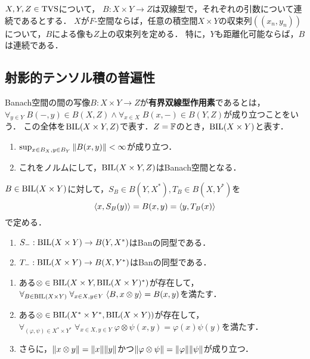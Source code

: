 \documentclass[uplatex,dvipdfmx]{jsreport}
\begin{document}
\begin{theorem}
    $X,Y,Z\in\mathrm{TVS}$について，
    $B:X\times Y\to Z$は双線型で，それぞれの引数について連続であるとする．
    $X$が$F$-空間ならば，任意の積空間$X\times Y$の収束列$((x_n,y_n))$について，$B$による像も$Z$上の収束列を定める．
    特に，$Y$も距離化可能ならば，$B$は連続である．
\end{theorem}

\subsection{射影的テンソル積の普遍性}

\begin{definition}
    Banach空間の間の写像$B:X\times Y\to Z$が\textbf{有界双線型作用素}であるとは，$\forall_{y\in Y}\;B(-,y)\in B(X,Z)\land\forall_{x\in X}\;B(x,-)\in B(Y,Z)$が成り立つことをいう．
    この全体を$\mathrm{BIL}(X\times Y,Z)$で表す．$Z=\mathbb{F}$のとき，$\mathrm{BIL}(X\times Y)$と表す．
\end{definition}

\begin{proposition}[有界双線型作用素の空間]\mbox{}
    \begin{enumerate}
        \item $\sup_{x\in B_X,y\in B_Y}\|B(x,y)\|<\infty$が成り立つ．
        \item これをノルムにして，$\mathrm{BIL}(X\times Y,Z)$はBanach空間となる．
    \end{enumerate}
\end{proposition}

\begin{proposition}
    $B\in\mathrm{BIL}(X\times Y)$に対して，$S_B\in B(Y,X^*),T_B\in B(X,Y^*)$を
    \[\langle x,S_B(y)\rangle=B(x,y)=\langle y,T_B(x)\rangle\]
    で定める．
    \begin{enumerate}
        \item $S_-:\mathrm{BIL}(X\times Y)\to B(Y,X^*)$はBanの同型である．
        \item $T_-:\mathrm{BIL}(X\times Y)\to B(X,Y^*)$はBanの同型である．
    \end{enumerate}
\end{proposition}

\begin{proposition}\mbox{}
    \begin{enumerate}
        \item ある$\otimes\in\mathrm{BIL}(X\times Y,\mathrm{BIL}(X\times Y)^*)$が存在して，$\forall_{B\in\mathrm{BIL}(X\times Y)}\;\forall_{x\in X,y\in Y}\;\langle B,x\otimes y\rangle=B(x,y)$を満たす．
        \item ある$\otimes\in\mathrm{BIL}(X^*\times Y^*,\mathrm{BIL}(X\times Y))$が存在して，$\forall_{(\varphi,\psi)\in X^*\times Y^*}\;\forall_{x\in X,y\in Y}\;\varphi\otimes\psi(x,y)=\varphi(x)\psi(y)$を満たす．
        \item さらに，$\|x\otimes y\|=\|x\|\|y\|$かつ$\|\varphi\otimes\psi\|=\|\varphi\|\|\psi\|$が成り立つ．
    \end{enumerate}
\end{proposition}
\end{document}
